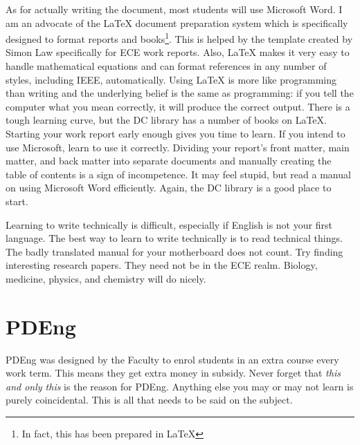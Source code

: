 \documentclass{book}
\begin{document}
As for actually writing the document, most students will use Microsoft Word. I am an advocate of the \LaTeX{} document preparation system which is specifically designed to format reports and books\footnote{In fact, this has been prepared in \LaTeX{}}. This is helped by the template created by Simon Law specifically for ECE work reports. Also, \LaTeX{} makes it very easy to handle mathematical equations and can format references in any number of styles, including IEEE, automatically. Using \LaTeX{} is more like programming than writing and the underlying belief is the same as programming: if you tell the computer what you mean correctly, it will produce the correct output. There is a tough learning curve, but the DC library has a number of books on \LaTeX{}. Starting your work report early enough gives you time to learn. If you intend to use Microsoft, learn to use it correctly. Dividing your report's front matter, main matter, and back matter into separate documents and manually creating the table of contents is a sign of incompetence. It may feel stupid, but read a manual on using Microsoft Word efficiently. Again, the DC library is a good place to start.


Learning to write technically is difficult, especially if English is not your first language. The best way to learn to write technically is to read technical things. The badly translated manual for your motherboard does not count. Try finding interesting research papers. They need not be in the ECE realm. Biology, medicine, physics, and chemistry will do nicely.

\chapter{PDEng}
PDEng was designed by the Faculty to enrol students in an extra course every work term. This means they get extra money in subsidy. Never forget that \emph{this and only this} is the reason for PDEng. Anything else you may or may not learn is purely coincidental. This is all that needs to be said on the subject.
\end{document}
